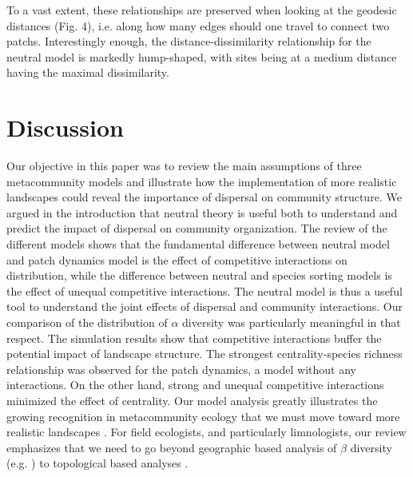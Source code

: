 \documentclass[12pt]{article}
\begin{document}
To a vast extent, these relationships are preserved when looking at the
geodesic distances (Fig. 4), i.e. along how many edges should one travel to
connect two patchs. Interestingly enough, the distance-dissimilarity
relationship for the neutral model is markedly hump-shaped, with sites being at
a medium distance having the maximal dissimilarity.

\section*{Discussion}

Our objective in this paper was to review the main assumptions of three
metacommunity models and illustrate how the implementation of more realistic
landscapes could reveal the importance of dispersal on community structure. We
argued in the introduction that neutral theory is useful both to understand and
predict the impact of dispersal on community organization. The review of the
different models shows that the fundamental difference between neutral model
and patch dynamics model is the effect of competitive interactions on
distribution, while the difference between neutral and species sorting
models is the effect of unequal competitive interactions. The neutral model is
thus a useful tool to understand the joint effects of dispersal and community
interactions. Our comparison of the distribution of $\alpha$ diversity was
particularly meaningful in that respect. The simulation results show that
competitive interactions buffer the potential impact of landscape structure. The
strongest centrality-species richness relationship was observed for the patch
dynamics, a model without any interactions. On the other hand, strong and
unequal competitive interactions minimized the effect of centrality. Our model
analysis greatly illustrates the growing recognition in metacommunity ecology
that we must move toward more realistic landscapes \parencite{Gilarranz2012}.
For field ecologists, and particularly limnologists, our review emphasizes that
we need to go beyond geographic based analysis of $\beta$ diversity (e.g.
\parencite{Legendre2005}) to topological based analyses
\parencite{dal10, Peterson2013}.
\end{document}
